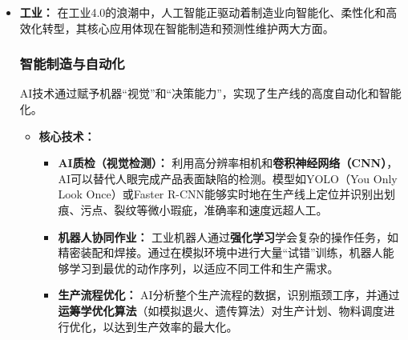 \begin{itemize}
    \item \textbf{工业：} 在工业4.0的浪潮中，人工智能正驱动着制造业向智能化、柔性化和高效化转型，其核心应用体现在智能制造和预测性维护两大方面。

    \subsubsection{智能制造与自动化}
    AI技术通过赋予机器“视觉”和“决策能力”，实现了生产线的高度自动化和智能化。
    \begin{itemize}
        \item \textbf{核心技术：}
            \begin{itemize}
                \item \textbf{AI质检（视觉检测）：} 利用高分辨率相机和\textbf{卷积神经网络（CNN）}，AI可以替代人眼完成产品表面缺陷的检测。模型如YOLO（You Only Look Once）或Faster R-CNN能够实时地在生产线上定位并识别出划痕、污点、裂纹等微小瑕疵，准确率和速度远超人工。
                \item \textbf{机器人协同作业：} 工业机器人通过\textbf{强化学习}学会复杂的操作任务，如精密装配和焊接。通过在模拟环境中进行大量“试错”训练，机器人能够学习到最优的动作序列，以适应不同工件和生产需求。
                \item \textbf{生产流程优化：} AI分析整个生产流程的数据，识别瓶颈工序，并通过\textbf{运筹学优化算法}（如模拟退火、遗传算法）对生产计划、物料调度进行优化，以达到生产效率的最大化。
            \end{itemize}
    \end{itemize}


\end{itemize}
